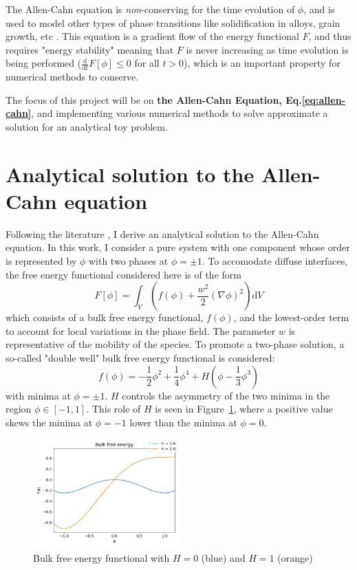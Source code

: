 \documentclass[12pt]{article}
\begin{document}
The Allen-Cahn equation is \textit{non}-conserving for the time evolution of $\phi$, and is used to model other types of phase transitions like solidification in alloys, grain growth, etc \cite{biner2017programming}.
This equation is a gradient flow of the energy functional $F$, and thus requires "energy stability" meaning that $F$ is never increasing as time evolution is being performed ($\frac{\mathrm{d}}{\mathrm{d}t} F[\phi] \leq 0$ for all $t>0$), which is an important property for numerical methods to conserve.

The focus of this project will be on \textbf{the Allen-Cahn Equation, Eq.\eqref{eq:allen-cahn}}, and implementing various numerical methods to solve approximate a solution for an analytical toy problem.

\section{Analytical solution to the Allen-Cahn equation}
Following the literature \cite{provatas2011phase}, I derive an analytical solution to the Allen-Cahn equation.
In this work, I consider a pure system with one component whose order is represented by $\phi$ with two phases at $\phi=\pm 1$.
To accomodate diffuse interfaces, the free energy functional considered here is of the form
\begin{equation}
    F[\phi] = \int_V \left(f(\phi) + \frac{w^2}{2}(\nabla \phi)^2\right) \mathrm{d}V \label{eq:functional}
\end{equation}
which consists of a bulk free energy functional, $f(\phi)$, and the lowest-order term to account for local variations \cite{cahn1958free} in the phase field.
The parameter $w$ is representative of the mobility of the species.
To promote a two-phase solution, a so-called "double well" bulk free energy functional is considered:
\begin{equation}
    f(\phi) = -\frac{1}{2}\phi^2 + \frac{1}{4}\phi^4 + H (\phi-\frac{1}{3}\phi^3)
\end{equation}
with minima at $\phi = \pm 1$. 
$H$ controls the asymmetry of the two minima in the region $\phi \in [-1, 1]$.
This role of $H$ is seen in Figure~\ref{fig:energy_well}, where a positive value skews the minima at $\phi=-1$ lower than the minima at $\phi = 0$.

\begin{figure}
    \centering
    \includegraphics[width=0.5\textwidth]{../figures/energy_well.png}
    \caption{Bulk free energy functional with $H = 0$ (blue) and $H = 1$ (orange)}
    \label{fig:energy_well}
\end{figure}
\end{document}
